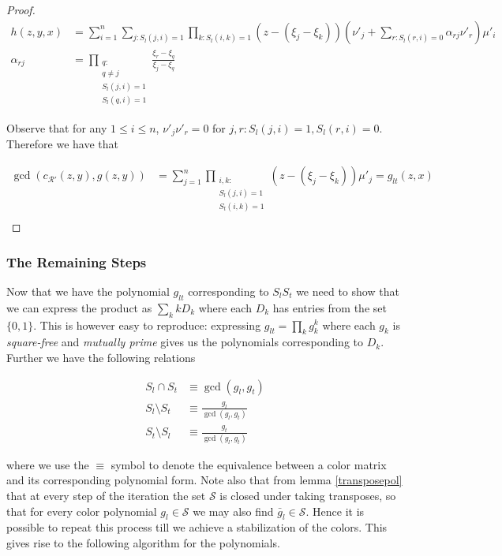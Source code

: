 \begin{proof}
		\begin{align*}
			h(z,y,x) &= \sum_{i=1}^n \sum_{j:S_l(j,i)=1} 
			\prod_{k:S_t(i,k)=1} \left(z-\left(\xi_j-\xi_k\right)\right)
			 \left(\nu'_j + \sum_{r:S_l(r,i)=0} \alpha_{rj}\nu'_r\right)\mu'_i\\
			\alpha_{rj} &= \prod_{\substack{
							q:\\
							q\neq j\\
							S_l(j,i)=1\\
						S_l(q,i)=1}} \frac{\xi_r-\xi_q}{\xi_j-\xi_q}
		\end{align*}

		Observe that for any $1 \le i \le n$, $\nu'_j\nu'_r=0$ for $j,r:S_l(j,i)=1,S_l(r,i)=0$. Therefore we have that 

		\begin{align*}
			\gcd(c_{\mathcal{R}'}(z,y),g(z,y)) &= \sum_{j=1}^n \prod_{\substack{
											i,k:\\
											S_l(j,i)=1\\
										S_t(i,k)=1\\}} (z-(\xi_j-\xi_k))\mu'_j = g_{lt}(z,x)
		\end{align*}
	\end{proof}


	\subsubsection{The Remaining Steps}
	Now that we have the polynomial $g_{lt}$ corresponding to $S_lS_t$ we need to show that we can express the product as $\sum_{k}kD_k$ where each $D_k$ has entries from the set $\{0,1\}$. This is however easy to reproduce: 
	expressing $g_{lt}=\prod_{k}g_k^k$ where each $g_k$ is \emph{square-free} and \emph{mutually prime} gives us the polynomials corresponding to $D_k$. Further we have the following relations

	\begin{align*}
		S_l \cap S_t &\equiv \gcd(g_l,g_t) \\
		S_l \setminus S_t &\equiv \frac{g_l}{\gcd(g_l,g_t)}\\
		S_t \setminus S_l &\equiv \frac{g_t}{\gcd(g_l,g_t)}
	\end{align*}

	where we use the $\equiv$ symbol to denote the equivalence between a color matrix and its corresponding polynomial form. Note also that from lemma \ref{transposepol} that at every step of the iteration the set $\mathcal{S}$
	is closed under taking transposes, so that for every color polynomial $g_l \in \mathcal{S}$ we may also find $\bar{g}_l \in \mathcal{S}$. Hence it is possible to repeat this process till we achieve a stabilization of the
	colors. This gives rise to the following algorithm for the polynomials.

